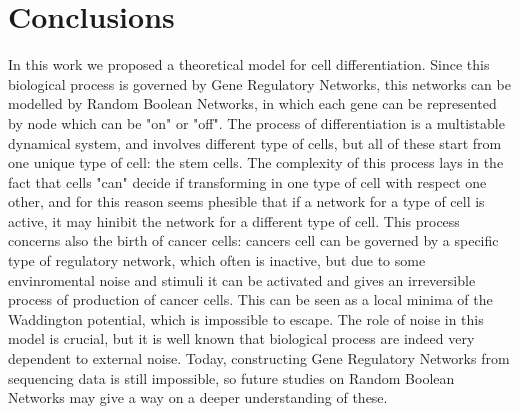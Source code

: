 \chapter*{Conclusions}
\lhead[\fancyplain{}{\bfseries\thepage}]{\fancyplain{}{\bfseries\rightmark}}

In this work we proposed a theoretical model for cell differentiation.
Since this biological process is governed by Gene Regulatory Networks, this networks can be modelled by Random Boolean Networks, in which each gene can be represented by  node which can be "on" or "off".
The process of differentiation is a multistable dynamical system, and involves different type of cells, but all of these start from one unique type of cell: the stem cells. The complexity of this process lays in the fact that cells "can" decide if transforming in one type of cell with respect one other, and for this reason seems phesible that if a network for a type of cell is active, it may hinibit the network for a different type of cell.
This process concerns also the birth of cancer cells: cancers cell can be governed by a specific type of regulatory network, which often is inactive, but due to some envinromental noise and stimuli it can be activated and gives an irreversible process of production of cancer cells. This can be seen as a local minima of the Waddington potential, which is impossible to escape.
The role of noise in this model is crucial, but it is well known that biological process are indeed very dependent to external noise.
Today, constructing Gene Regulatory Networks from sequencing data is still impossible, so future studies on Random Boolean Networks may give a way on a deeper understanding of these. 

